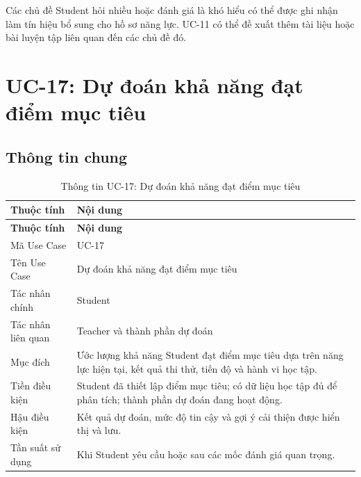 Các chủ đề Student hỏi nhiều hoặc đánh giá là khó hiểu có thể được ghi
nhận làm tín hiệu bổ sung cho hồ sơ năng lực. UC-11 có thể đề xuất thêm
tài liệu hoặc bài luyện tập liên quan đến các chủ đề đó.

\section{UC-17: Dự đoán khả năng đạt điểm mục tiêu}
\label{sec:uc17-score-prediction}

\subsection{Thông tin chung}

\begin{longtable}{|p{4.2cm}|p{10.2cm}|}
	\caption{Thông tin UC-17: Dự đoán khả năng đạt điểm mục tiêu}
	\label{tab:uc17-info}\\
	\hline
	\textbf{Thuộc tính} & \textbf{Nội dung} \\
	\hline
	\endfirsthead
	
	\hline
	\textbf{Thuộc tính} & \textbf{Nội dung} \\
	\hline
	\endhead
	
	Mã Use Case &
	UC-17 \\
	\hline
	
	Tên Use Case &
	Dự đoán khả năng đạt điểm mục tiêu \\
	\hline
	
	Tác nhân chính &
	Student \\
	\hline
	
	Tác nhân liên quan &
	Teacher và thành phần dự đoán \\
	\hline
	
	Mục đích &
	Ước lượng khả năng Student đạt điểm mục tiêu dựa trên năng lực hiện tại,
	kết quả thi thử, tiến độ và hành vi học tập. \\
	\hline
	
	Tiền điều kiện &
	Student đã thiết lập điểm mục tiêu; có dữ liệu học tập đủ để phân tích;
	thành phần dự đoán đang hoạt động. \\
	\hline
	
	Hậu điều kiện &
	Kết quả dự đoán, mức độ tin cậy và gợi ý cải thiện được hiển thị và lưu. \\
	\hline
	
	Tần suất sử dụng &
	Khi Student yêu cầu hoặc sau các mốc đánh giá quan trọng. \\
	\hline
	
\end{longtable}

